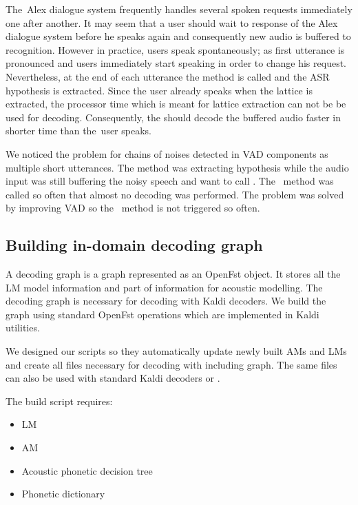 The~Alex dialogue system frequently handles several spoken requests immediately one after another.
It may seem that a user should wait to response of the Alex dialogue system before he speaks again and consequently new audio is buffered to recognition.
However in practice, users speak spontaneously; as first utterance is pronounced and users immediately start speaking in order to change his request.
Nevertheless, at the end of each utterance the  method is called and the ASR hypothesis is extracted.
Since the user already speaks when the lattice is extracted, the processor time which is meant for lattice extraction can not be be used for decoding.
Consequently, the  should decode the buffered audio faster in shorter time than the~user speaks.

We noticed the problem for chains of noises detected in \ac{VAD} components as multiple short utterances.
The  method was extracting hypothesis while the audio input was still buffering the noisy speech and want to call .
The~ method was called so often that almost no decoding was performed.
The problem was solved by improving \ac{VAD} so the~ method is not triggered so often.

\subsection{Building in-domain decoding graph}
\label{sub:hclg}
A decoding graph is a graph represented as an OpenFst object. It stores all the \ac{LM} model information and part of information for acoustic modelling. 
The decoding graph is necessary for decoding with Kaldi decoders.
We build the  graph using standard OpenFst operations which are implemented in Kaldi utilities. 

We designed our scripts so they automatically update newly built \acp{AM} and \acp{LM} and create all files necessary for decoding with  including  graph.
The same files can also be used with standard Kaldi decoders or .

The  build script requires:
\begin{itemize}
    \item \acl{LM}
    \item \acl{AM}
    \item Acoustic phonetic decision tree
    \item Phonetic dictionary
\end{itemize}

